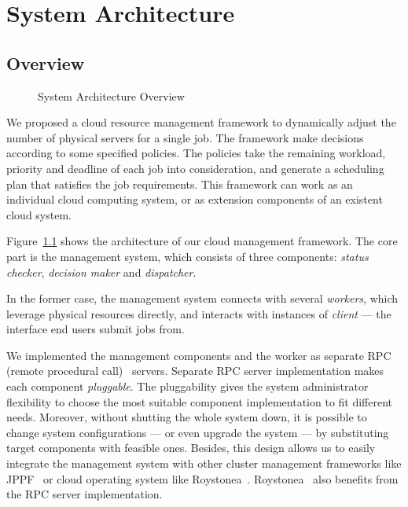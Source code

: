 \chapter{System Architecture}

\section{Overview}

\begin{figure}[h]
  \centering
  
  \caption{System Architecture Overview}
  \label{fig:archi-overview}
\end{figure}

We proposed a cloud resource management framework to dynamically adjust
the number of physical servers for a single job.
The framework make decisions according to some specified policies.
The policies take the remaining workload, priority and deadline of each
job into consideration, and generate a scheduling plan that satisfies
the job requirements.
This framework can work as an individual cloud computing system, or as
extension components of an existent cloud system.

Figure~\ref{fig:archi-overview} shows the architecture of our cloud
management framework.
The core part is the management system, which consists of three
components: \emph{status checker}, \emph{decision maker} and
\emph{dispatcher}.

In the former case, the management system connects with several
\emph{workers}, which leverage physical resources directly, and
interacts with instances of \emph{client} --- the interface end users
submit jobs from.

We implemented the management components and the worker as separate RPC
(remote procedural call)~\cite{cite:RPC} servers.
Separate RPC server implementation makes each component
\emph{pluggable}.
The pluggability gives the system administrator flexibility to choose
the most suitable component implementation to fit different needs.
Moreover, without shutting the whole system down, it is possible to
change system configurations --- or even upgrade the system --- by
substituting target components with feasible ones.
Besides, this design allows us to easily integrate the management system
with other cluster management frameworks like JPPF~\cite{cite:JPPF} or
cloud operating system like Roystonea~\cite{cite:roystonea}.
Roystonea~\cite{cite:roystonea} also benefits from the RPC server
implementation.

